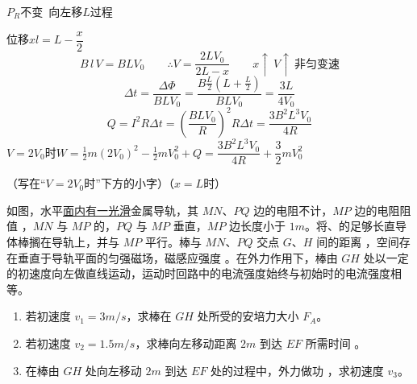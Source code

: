 \begin{problem}
$P_R$不变\ 向左移$L$过程
\begin{solution}
位移$x$\quad $l=L-\dfrac{x}{2}$
\[ B\,l\,V=BLV_0\qquad \therefore V=\frac{2LV_0}{2L-x}\qquad x\uparrow\ V\uparrow\ \text{非匀变速} \] %
\[ \Delta t=\frac{\Delta\Phi}{BLV_0}=\frac{B\frac{L}{2}\left(L+\frac{L}{2}\right)}{BLV_0}=\frac{3L}{4V_0} \]
\[ Q=I^2R\Delta t=\left(\frac{BLV_0}{R}\right)^2R\Delta t=\frac{3B^2L^3V_0}{4R} \]
$V=2V_0$时\quad $W=\tfrac12m(2V_0)^2-\tfrac12mV_0^2+Q=\dfrac{3B^2L^3V_0}{4R}+\dfrac32mV_0^2$

（写在“$V=2V_0$时”下方的小字）（$x=L$时）
\end{solution}
\end{problem}

\begin{problem}
如图，水平\underline{面内有一光滑}金属导轨，其 $MN$、$PQ$ 边的电阻不计，$MP$ 边的电阻阻值 ，$MN$ 与 $MP$ 的，$PQ$ 与 $MP$ 垂直，$MP$ 边长度小于 $1\unit{m}$。将、的足够长直导体棒搁在导轨上，并与 $MP$ 平行。棒与 $MN$、$PQ$ 交点 $G$、$H$ 间的距离 ，空间存在垂直于导轨平面的匀强磁场，磁感应强度 。在外力作用下，棒由 $GH$ 处以一定的初速度向左做直线运动，运动时回路中的电流强度始终与初始时的电流强度相等。


\begin{enumerate}[label=(\arabic*)]
\item 若初速度 $v_1=3\unit{m/s}$，求棒在 $GH$ 处所受的安培力大小 $F_A$。
\item 若初速度 $v_2=1.5\unit{m/s}$，求棒向左移动距离 $2\unit{m}$ 到达 $EF$ 所需时间 。
\item 在棒由 $GH$ 处向左移动 $2\unit{m}$ 到达 $EF$ 处的过程中，外力做功 ，求初速度 $v_3$。
\end{enumerate}
\end{problem}

